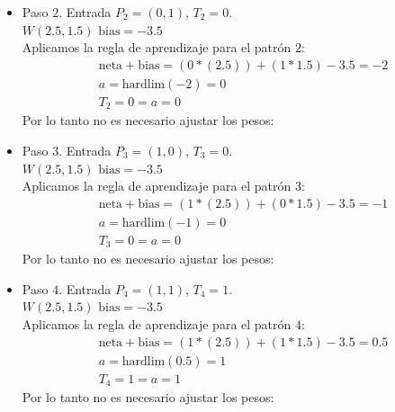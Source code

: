 \documentclass{article}
\begin{document}
{{\begin{itemize}
\begin{itemize}
Aplicamos la regla de aprendizaje para el patrón $1$:
\begin{align*}
&\text{neta} + \text{bias}= (0 * (2.5)) + (0 * 1.5) - 3.5 = -3.5\\
&a = \text{hardlim}(-3.5) = 0 \\
&T_1 = 0 = a = 0
\end{align*}
Por lo tanto no es necesario ajustar los pesos:

\item Paso $2$. Entrada $P_2 = (0, 1)$, $T_2 = 0$. \\
$W(2.5, 1.5)$  $\text{bias} = -3.5$ \\

Aplicamos la regla de aprendizaje para el patrón $2$:
\begin{align*}
&\text{neta} + \text{bias}= (0 * (2.5)) + (1 * 1.5) - 3.5 = -2\\
&a = \text{hardlim}(-2) = 0 \\
&T_2 = 0 = a = 0
\end{align*}
Por lo tanto no es necesario ajustar los pesos:


\item Paso $3$. Entrada $P_3 = ( 1, 0)$, $T_3 = 0$. \\
$W(2.5, 1.5)$  $\text{bias} = -3.5$ \\

Aplicamos la regla de aprendizaje para el patrón $3$:
\begin{align*}
&\text{neta} + \text{bias}= (1 * (2.5)) + (0 * 1.5) - 3.5 = -1\\
&a = \text{hardlim}(-1) = 0 \\
&T_3 = 0 = a = 0
\end{align*}
Por lo tanto no es necesario ajustar los pesos:

\item Paso $4$. Entrada $P_4 = (1, 1)$, $T_4 = 1$. \\
$W(2.5, 1.5)$  $\text{bias} = -3.5$ \\

Aplicamos la regla de aprendizaje para el patrón $4$:
\begin{align*}
&\text{neta} + \text{bias}= (1 * (2.5)) + (1 * 1.5) - 3.5 = 0.5\\
&a = \text{hardlim}(0.5) = 1 \\
&T_4 = 1 = a = 1
\end{align*}
Por lo tanto no es necesario ajustar los pesos:
\end{itemize}
\end{itemize}

}}
\end{document}
